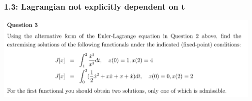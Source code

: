 \subsubsection{1.3: Lagrangian not explicitly dependent on t}
\begin{mdframed}
  \includegraphics[width=400pt]{img/cov-haliakis-ooc-1-3.png}
\end{mdframed}

